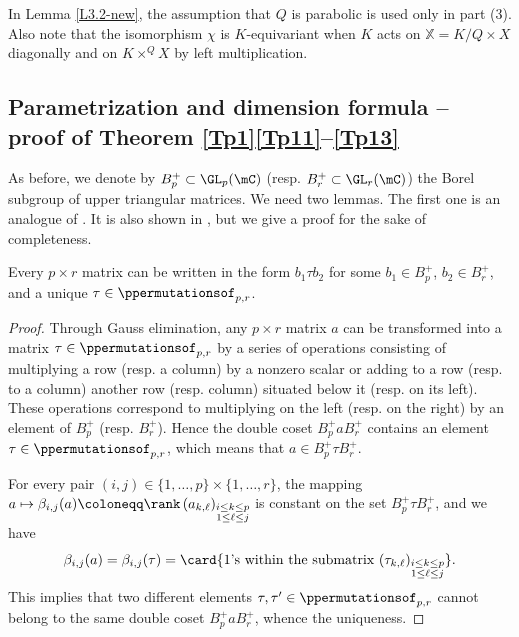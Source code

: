 \begin{rema}
In Lemma \ref{L3.2-new}, the assumption that $Q$ is parabolic is used only in part (3).
Also note that the isomorphism $\chi$ is $K$-equivariant when $K$ acts on $\mathbb{X}=K/Q\times X$ diagonally and on $K\times^Q X$ by left multiplication.
\end{rema}

\subsection{Parametrization and dimension formula -- proof of  Theorem \ref{Tp1}\ref{Tp11}--\ref{Tp13}}\label{section-3.2}


As before, we denote by $B_p^+\subset\GL_p(\mC)$ (resp. $B_r^+\subset\GL_r(\mC)$) the Borel subgroup of upper triangular matrices. We need two lemmas. The first one is an analogue of \cite[Proposition 6.3]{FN2}.
It is also shown in \cite[p.~390]{Fulton-1991}, but we give a proof for the sake of completeness.

\begin{lemma}
\label{L3.2}
Every $p\times r$ matrix can be written in the form
$b_1\tau b_2$
for some $b_1\in B_p^+$, $b_2\in B_r^+$, and a unique $\tau\in\ppermutationsof_{p,r}$.
\end{lemma}

\begin{proof}
Through Gauss elimination, any $p\times r$ matrix $a$ can be
transformed into a matrix $\tau\in\ppermutationsof_{p,r}$ by a
series of operations consisting of multiplying a row (resp. a
column) by a nonzero scalar or adding to a row (resp. to a column)
another row (resp. column) situated below it (resp. on its left).
These operations correspond to multiplying on the left (resp. on
the right) by an element of $B_p^+$ (resp. $B_r^+$). Hence the
double coset $B_p^+aB_r^+$ contains an element
$\tau\in\ppermutationsof_{p,r}$, which means that $a\in
B_p^+ \tau B_r^+$.

For every pair $(i,j)\in\{1,\ldots,p\}\times\{1,\ldots,r\}$, the mapping $a\mapsto \beta_{i,j}(a)\coloneqq \rank\,(a_{k,\ell})_{\substack{i\leq k\leq p\\ 1\leq \ell\leq j}}$
is constant on the set $B_p^+\tau B_r^+$, and we have
\[\beta_{i,j}(a)=\beta_{i,j}(\tau)=\card\{\mbox{$1$'s within the submatrix $(\tau_{k,\ell})_{\substack{i\leq k\leq p\\ 1\leq \ell\leq j}}$}\}.\]
This implies that two different elements $\tau,\tau'\in\ppermutationsof_{p,r}$ cannot belong to the same double coset $B_p^+aB_r^+$, whence the uniqueness.
\end{proof}

